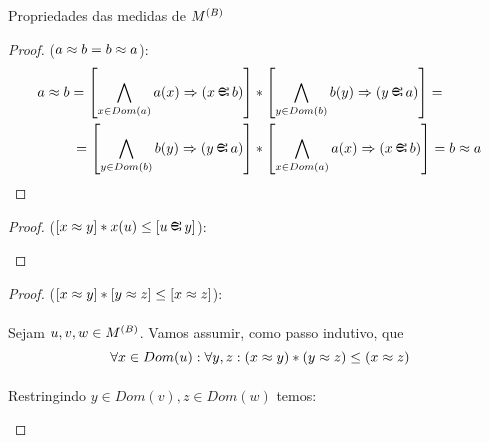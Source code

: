 \begin{proposition}{Propriedades das medidas de $\M{B}$}
\begin{proof}
            ($a\Meq b = b \Meq a$):
            \begin{align*}
                a\Meq b = \left[\bigwedge_{x\in Dom(a)}a(x)\RAR (x\Min b)\right]&*\left[\bigwedge_{y\in Dom(b)}b(y)\RAR (y\Min a)\right] =\\
                =\left[\bigwedge_{y\in Dom(b)}b(y)\RAR (y\Min a)\right]&*\left[\bigwedge_{x\in Dom(a)}a(x)\RAR (x\Min b)\right] = b\Meq a
            \end{align*}\eop
        \end{proof}
        \begin{proof}
            
            ($[x\Meq y] *  x(u) \leq [u\Min y]$):
            \begin{prooftree}
            \end{prooftree}\eop
        \end{proof}
        \begin{proof}
            
            ($[x\Meq y] * [y\Meq z] \leq [x\Meq z]$):
            \paragraph{}
                Sejam $u,v,w\in\M{B}$. Vamos assumir, como passo indutivo, que
            $$ \forall x\in Dom(u):\forall y,z: (x\Meq y) * (y\Meq z) \leq (x\Meq z)$$
            \paragraph{}
                Restringindo $y\in Dom(v), z\in Dom(w)$ temos:
            \begin{prooftree}
            \end{prooftree}

\end{proof}
\end{proposition}
